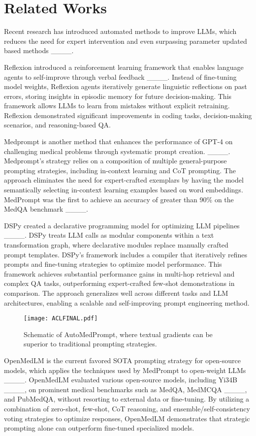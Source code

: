 \section{Related Works}
Recent research has introduced automated methods to improve LLMs, which reduces the need for expert intervention and even surpassing parameter updated based methods ____.

Reflexion introduced a reinforcement learning framework that enables language agents to self-improve through verbal feedback ____. Instead of fine-tuning model weights, Reflexion agents iteratively generate linguistic reflections on past errors, storing insights in episodic memory for future decision-making. This framework allows LLMs to learn from mistakes without explicit retraining. Reflexion demonstrated significant improvements in coding tasks, decision-making scenarios, and reasoning-based QA. 

Medprompt is another method that enhances the performance of GPT-4 on challenging medical problems through systematic prompt creation. ____. Medprompt's strategy relies on a composition of multiple general-purpose prompting strategies, including in-context learning and CoT prompting. The approach eliminates the need for expert-crafted exemplars by having the model semantically selecting in-context learning examples based on word embeddings. MedPrompt was the first to achieve an accuracy of greater than 90\% on the MedQA benchmark ____.

DSPy created a declarative programming model for optimizing LLM pipelines ____. DSPy treats LLM calls as modular components within a text transformation graph, where declarative modules replace manually crafted prompt templates. DSPy's framework includes a compiler that iteratively refines prompts and fine-tuning strategies to optimize model performance. This framework achieves substantial performance gains in multi-hop retrieval and complex QA tasks, outperforming expert-crafted few-shot demonstrations in comparison. The approach generalizes well across different tasks and LLM architectures, enabling a scalable and self-improving prompt engineering method.

\begin{figure*}[t] %
    \centering
    \texttt{[image: ACLFINAL.pdf]} %
    \caption{Schematic of AutoMedPrompt, where textual gradients can be superior to traditional prompting strategies.}
    \label{fig:example}
\end{figure*}
OpenMedLM is the current favored SOTA prompting strategy for open-source models, which applies the techniques used by MedPrompt to open-weight LLMs ____. OpenMedLM evaluated various open-source models, including Yi34B ____, on prominent medical benchmarks such as MedQA, MedMCQA ____, and PubMedQA, without resorting to external data or fine-tuning. By utilizing a combination of zero-shot, few-shot, CoT reasoning, and ensemble/self-consistency voting strategies to optimize responses, OpenMedLM demonstrates that strategic prompting alone can outperform fine-tuned specialized models.

